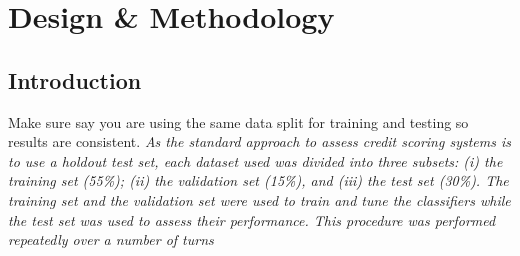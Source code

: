 
\chapter{Design \& Methodology} %

\label{Chapter4} %


\section{Introduction}

Make sure say you are using the same data split for training and testing so results are consistent.
\textit{
As the standard approach to assess credit scoring
systems is to use a holdout test set, each dataset used was divided into three subsets:
(i) the training set (55\%); (ii) the validation set (15\%), and (iii) the test set (30\%).
The training set and the validation set were used to train and tune the classifiers
while the test set was used to assess their performance. This procedure was performed
repeatedly over a number of turns \citep{kennedy_credit_2013}}